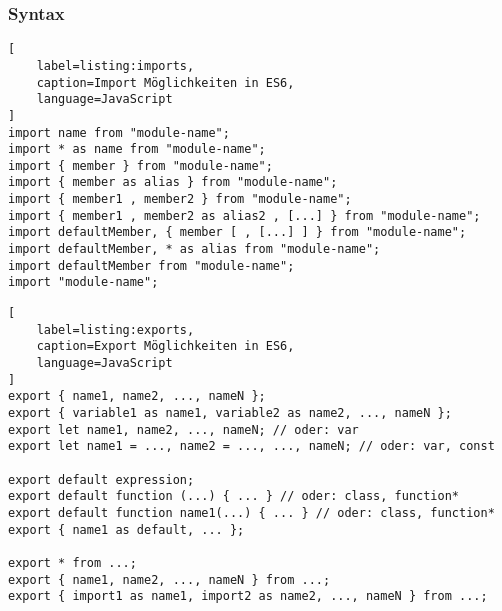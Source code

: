 \subsubsection{Syntax}
\label{subsubsection:Syntax}

\begin{lstlisting}[
    label=listing:imports,
	caption=Import Möglichkeiten in ES6,
	language=JavaScript
]
import name from "module-name";
import * as name from "module-name";
import { member } from "module-name";
import { member as alias } from "module-name";
import { member1 , member2 } from "module-name";
import { member1 , member2 as alias2 , [...] } from "module-name";
import defaultMember, { member [ , [...] ] } from "module-name";
import defaultMember, * as alias from "module-name";
import defaultMember from "module-name";
import "module-name";
\end{lstlisting}

\autocite{ES6Imports}

\begin{lstlisting}[
    label=listing:exports,
	caption=Export Möglichkeiten in ES6,
	language=JavaScript
]
export { name1, name2, ..., nameN };
export { variable1 as name1, variable2 as name2, ..., nameN };
export let name1, name2, ..., nameN; // oder: var
export let name1 = ..., name2 = ..., ..., nameN; // oder: var, const

export default expression;
export default function (...) { ... } // oder: class, function*
export default function name1(...) { ... } // oder: class, function*
export { name1 as default, ... };

export * from ...;
export { name1, name2, ..., nameN } from ...;
export { import1 as name1, import2 as name2, ..., nameN } from ...;
\end{lstlisting}